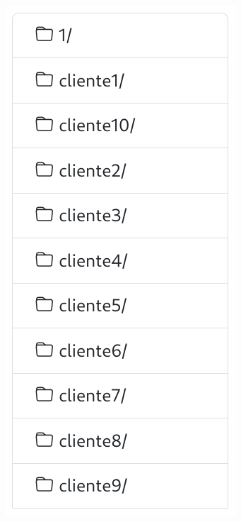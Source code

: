 \documentclass{\ClassPath/viu-tfm-template}
\begin{document}
{
\begin{minipage}{0.3\linewidth}
    \includegraphics[width=\linewidth]{img/tree1.png}

\end{minipage}}
\end{document}
